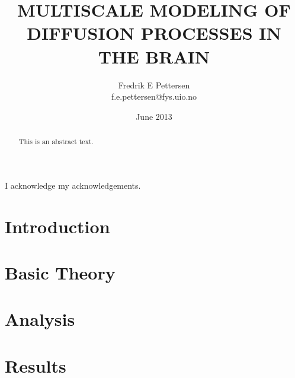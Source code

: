 \documentclass[twoside,english]{uiofysmaster}
\author{Fredrik E Pettersen\\ f.e.pettersen@fys.uio.no}
\title{\uppercase{Multiscale modeling of diffusion processes in the brain}}
\date{June 2013}
\begin{document}
\maketitle

\begin{abstract}
This is an abstract text.
\end{abstract}


\begin{acknowledgements}
  I acknowledge my acknowledgements.
\end{acknowledgements}


\tableofcontents
\clearpage
\listoffigures
\clearpage
\listoftables

\chapter{Introduction}


\chapter{Basic Theory}



\chapter{Analysis}


\chapter{Results}
\printbibliography
\end{document}
